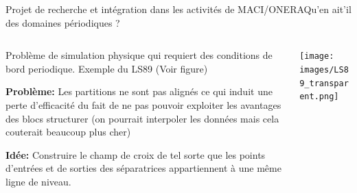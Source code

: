 \documentclass[compress,10pt,aspectratio=169]{beamer}
\begin{document}
\begin{frame}{\large Projet de recherche et intégration dans les activités de MACI/ONERA}{Qu'en ait'il des domaines périodiques ?}
\small
\begin{columns}
    \begin{column}{0.55\textwidth}
Problème de simulation physique qui requiert des conditions de bord periodique. Exemple du LS89 (Voir figure)\\\vspace{0.3cm}

\textbf{Problème:} Les partitions ne sont pas alignés ce qui induit une perte d'efficacité du fait de ne pas pouvoir exploiter les avantages des blocs structurer (on pourrait interpoler les données mais cela couterait beaucoup plus cher)\\\vspace{0.3cm}

\textbf{Idée:} Construire le champ de croix de tel sorte que les points d'entrées et de sorties des séparatrices appartiennent à une même ligne de niveau.








    \end{column}
    \begin{column}{0.45\textwidth}
    \vspace{-0.5cm}
        \centering
\texttt{[image: images/LS89\_transparent.png]}
    \end{column}
\end{columns}
\end{frame}
\end{document}
